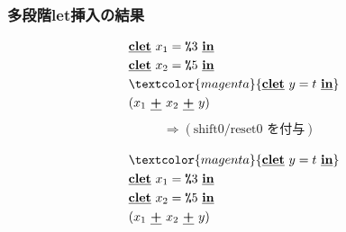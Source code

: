 \documentclass[dvipdfmx,cjk,xcolor=dvipsnames,envcountsect,notheorems,12pt]{beamer}
\newcommand\cPlus{\underline{\textbf{+}}}
\newcommand\cLet{\underline{\textbf{clet}}}
\newcommand\cIn{\underline{\textbf{in}}}
\newcommand\csp[1]{\texttt{\%}{#1}}
\newcommand\magenta[1]{\textcolor{magenta}{#1}}
\theoremstyle{definition}
\begin{document}
\begin{frame}
  \frametitle{多段階let挿入の結果}
  \begin{align*}
    & \cLet~x_1=\csp{3}~\cIn \\
    & \cLet~x_2=\csp{5}~\cIn \\
    & \magenta{\cLet~y=t~\cIn} \\
    & (x_1~\cPlus~x_2~\cPlus~y)
  \end{align*}
  \pause
  \begin{align*}
    & \Rightarrow (\text{shift0/reset0 を付与})\\
  \end{align*}
  \pause
  \begin{align*}
    & \magenta{\cLet~y=t~\cIn} \\
    & \cLet~x_1=\csp{3}~\cIn \\
    & \cLet~x_2=\csp{5}~\cIn \\
    & (x_1~\cPlus~x_2~\cPlus~y)
  \end{align*}
\end{frame}
\end{document}
